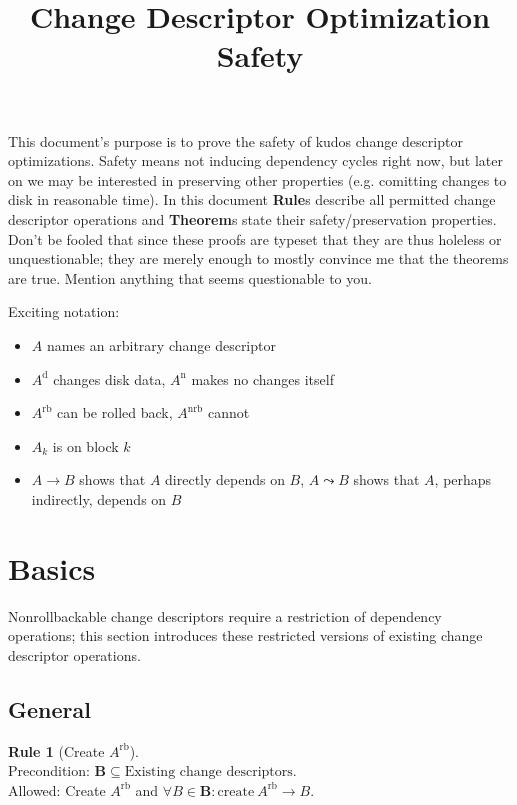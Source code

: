 \documentclass{article}
\title{Change Descriptor Optimization Safety}
\author{}
\date{}
\theoremstyle{definition}
\newtheorem{chrule}{Rule}[section]
\newcommand{\cd}[1]{\ensuremath{#1}}
\newcommand{\cdb}[2]{\ensuremath{\cd{#1}_#2}}
\newcommand{\dcd}[1]{\ensuremath{\cd{#1}^\mathrm{d}}}
\newcommand{\ncd}[1]{\ensuremath{\cd{#1}^\mathrm{n}}}
\newcommand{\rb}[1]{\ensuremath{\cd{#1}^\mathrm{rb}}}
\newcommand{\nrb}[1]{\ensuremath{\cd{#1}^\mathrm{nrb}}}
\newcommand{\depends}[2]{\ensuremath{#1\! \rightarrow\! #2}}
\newcommand{\indirdepends}[2]{\ensuremath{#1\! \leadsto\! #2}}
\newcommand{\cdset}[1]{\ensuremath{\mathbf{#1}}}
\begin{document}
\maketitle

This document's purpose is to prove the safety of kudos change
descriptor optimizations. Safety means not inducing dependency cycles
right now, but later on we may be interested in preserving other
properties (e.g. comitting changes to disk in reasonable time).
%
In this document \textbf{Rule}s describe all permitted change
descriptor operations and \textbf{Theorem}s state their
safety/preservation properties.
%
Don't be fooled that since these proofs are typeset that they are thus
holeless or unquestionable; they are merely enough to mostly convince
me that the theorems are true. Mention anything that seems
questionable to you.

Exciting notation:
\begin{itemize}
\item \cd{A} names an arbitrary change descriptor
\item \dcd{A} changes disk data, \ncd{A} makes no changes itself
\item \rb{A} can be rolled back, \nrb{A} cannot
\item \cdb{A}{k} is on block $k$
\item \depends{\cd{A}}{\cd{B}} shows that \cd{A} directly depends on
  \cd{B}, \indirdepends{\cd{A}}{\cd{B}} shows that \cd{A}, perhaps
  indirectly, depends on \cd{B}
\end{itemize}
\section{Basics}
\label{sec:basics}

Nonrollbackable change descriptors require a restriction of dependency
operations; this section introduces these restricted versions of
existing change descriptor operations.

\subsection{General}
\label{sec:basics:general}

\begin{chrule}[Create \rb{A}]\label{chrule:create}
  \mbox{}\\
  Precondition: \(\cdset{B} \subseteq \mbox{Existing change descriptors}\).\\
  Allowed: Create \rb{A} and \(\forall \cd{B}\! \in\! \cdset{B}\!: \mbox{create}\ \depends{\rb{A}}{\cd{B}}\).
\end{chrule}
\end{document}
